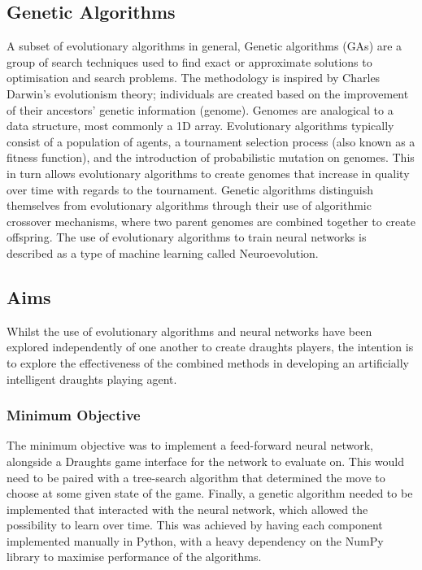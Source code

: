 \documentclass[12pt,a4paper]{article}
\begin{document}
 	\subsection{Genetic Algorithms}

    A subset of evolutionary algorithms in general, Genetic algorithms (GAs) are a group of search techniques used to find exact or approximate solutions to optimisation and search problems. The methodology is inspired by Charles Darwin's evolutionism theory; individuals are created based on the improvement of their ancestors' genetic information (genome). Genomes are analogical to a data structure, most commonly a 1D array. Evolutionary algorithms typically consist of a population of agents, a tournament selection process (also known as a fitness function), and the introduction of probabilistic mutation on genomes. This in turn allows evolutionary algorithms to create genomes that increase in quality over time with regards to the tournament. Genetic algorithms distinguish themselves from evolutionary algorithms through their use of algorithmic crossover mechanisms, where two parent genomes are combined together to create offspring. The use of evolutionary algorithms to train neural networks is described as a type of machine learning called Neuroevolution.

    \subsection{Aims}

    Whilst the use of evolutionary algorithms and neural networks have been explored independently of one another to create draughts players, the intention is to explore the effectiveness of the combined methods in developing an artificially intelligent draughts playing agent. 

    \subsubsection{Minimum Objective}

        The minimum objective was to implement a feed-forward neural network, alongside a Draughts game interface for the network to evaluate on. This would need to be paired with a tree-search algorithm that determined the move to choose at some given state of the game. Finally, a genetic algorithm needed to be implemented that interacted with the neural network, which allowed the possibility to learn over time. This was achieved by having each component implemented manually in Python, with a heavy dependency on the NumPy library to maximise performance of the algorithms.
\end{document}
